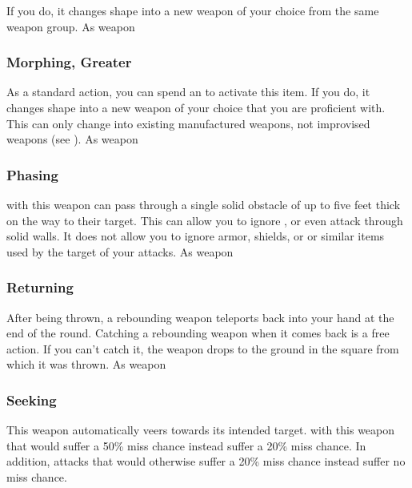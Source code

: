 If you do, it changes shape into a new weapon of your choice from the same weapon group.
 
 As weapon
\lowercase{\hypertarget{item:Morphing, Greater}{}}\label{item:Morphing, Greater}
\hypertarget{item:Morphing, Greater}{\subsubsection{Morphing, Greater\hfill{}}}
As a standard action, you can spend an  to activate this item.
If you do, it changes shape into a new weapon of your choice that you are proficient with.
This can only change into existing manufactured weapons, not improvised weapons (see ).
 
 As weapon
\lowercase{\hypertarget{item:Phasing}{}}\label{item:Phasing}
\hypertarget{item:Phasing}{\subsubsection{Phasing\hfill{}}}
 with this weapon can pass through a single solid obstacle of up to five feet thick on the way to their target.
This can allow you to ignore , or even attack through solid walls.
It does not allow you to ignore armor, shields, or or similar items used by the target of your attacks.
 
 As weapon
\lowercase{\hypertarget{item:Returning}{}}\label{item:Returning}
\hypertarget{item:Returning}{\subsubsection{Returning\hfill{}}}
After being thrown, a rebounding weapon teleports back into your hand at the end of the round.
Catching a rebounding weapon when it comes back is a free action.
If you can't catch it, the weapon drops to the ground in the square from which it was thrown.
 
 As weapon
\lowercase{\hypertarget{item:Seeking}{}}\label{item:Seeking}
\hypertarget{item:Seeking}{\subsubsection{Seeking\hfill{}}}
This weapon automatically veers towards its intended target.
 with this weapon that would suffer a 50\% miss chance instead suffer a 20\% miss chance.
In addition, attacks that would otherwise suffer a 20\% miss chance instead suffer no miss chance.
